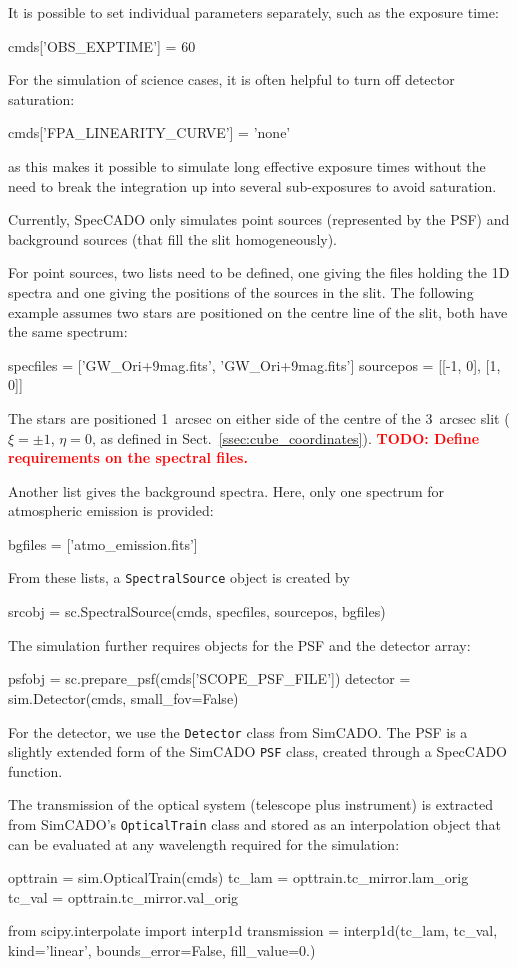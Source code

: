 \documentclass[a4paper,twoside,11pt]{article}
\newcommand{\TODO}[1]{\textcolor{red}{\bfseries TODO: #1}}
\begin{document}
It is possible to set individual parameters separately, such as the
exposure time:
\begin{pyin}
cmds['OBS_EXPTIME'] = 60
\end{pyin}
For the simulation of science cases, it is often helpful to turn off
detector saturation:
\begin{pyin}
cmds['FPA_LINEARITY_CURVE'] = 'none'
\end{pyin}
as this makes it possible to simulate long effective exposure times
without the need to break the integration up into several
sub-exposures to avoid saturation.

Currently, SpecCADO only simulates point sources (represented by the
PSF) and background sources (that fill the slit homogeneously).

For point sources, two lists need to be defined, one giving the files
holding the 1D spectra and one giving the positions of the sources in
the slit. The following example assumes two stars are positioned on
the centre line of the slit, both have the same spectrum:
\begin{pyin}
specfiles = ['GW_Ori+9mag.fits', 'GW_Ori+9mag.fits']
sourcepos = [[-1, 0], [1, 0]]
\end{pyin}
The stars are positioned 1~arcsec on either side of the centre of the
3~arcsec slit ($\xi=\pm 1$, $\eta=0$, as defined in
Sect.~\ref{ssec:cube_coordinates}).  \TODO{Define requirements on the
  spectral files.}

Another list gives the background spectra. Here, only one spectrum for
atmospheric emission is provided:
\begin{pyin}
bgfiles = ['atmo_emission.fits']
\end{pyin}

From these lists, a \lstinline{SpectralSource} object is created by
\begin{pyin}
srcobj = sc.SpectralSource(cmds, specfiles, sourcepos, bgfiles)
\end{pyin}

The simulation further requires objects for the PSF and the detector
array:
\begin{pyin}
psfobj = sc.prepare_psf(cmds['SCOPE_PSF_FILE'])
detector = sim.Detector(cmds, small_fov=False)
\end{pyin}
For the detector, we use the \lstinline{Detector} class from
SimCADO. The PSF is a slightly extended form of the SimCADO
\lstinline{PSF} class, created through a SpecCADO function.

The transmission of the optical system (telescope plus instrument) is
extracted from SimCADO's \lstinline{OpticalTrain} class and stored as
an interpolation object that can be evaluated at any wavelength
required for the simulation:
\begin{pyin}
opttrain = sim.OpticalTrain(cmds)
tc_lam = opttrain.tc_mirror.lam_orig
tc_val = opttrain.tc_mirror.val_orig

from scipy.interpolate import interp1d
transmission = interp1d(tc_lam, tc_val, kind='linear',
                        bounds_error=False, fill_value=0.)
\end{pyin}
\end{document}
